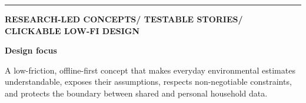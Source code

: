 \documentclass[12pt,a4paper]{article}
\begin{document}
\begin{titlepage}
\vspace{0.42cm}
{\color{Teal}\rule{1.30cm}{2pt}}\par
\vspace{0.15cm}
{\sffamily\footnotesize\bfseries\color{Teal}
RESEARCH-LED CONCEPTS\hspace{0.65em}/\hspace{0.65em}
TESTABLE STORIES\hspace{0.65em}/\hspace{0.65em}
CLICKABLE LOW-FI DESIGN\par}

\vspace{0.58cm}
\begin{tcolorbox}[
  colback=RowGray,colframe=RuleGray,boxrule=0.55pt,
  borderline west={2.5pt}{0pt}{Teal},
  arc=1.5mm,left=11pt,right=11pt,top=9pt,bottom=9pt,
  before skip=0pt,after skip=0pt
]
  {\sffamily\bfseries\color{Navy}Design focus\par}
  \vspace{0.16cm}
  {\small A low-friction, offline-first concept that makes everyday environmental
  estimates understandable, exposes their assumptions, respects non-negotiable
  constraints, and protects the boundary between shared and personal household data.\par}
\end{tcolorbox}


\end{titlepage}
\end{document}
